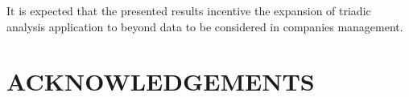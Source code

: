 \documentclass[a4paper,twoside]{article}
\begin{document}
It is expected that the presented results incentive the expansion of triadic analysis application to beyond data to be considered in companies management.

\section*{\uppercase{Acknowledgements}}




{\small
}



\end{document}
